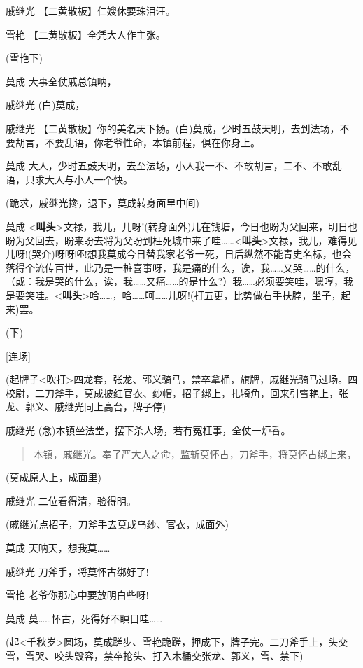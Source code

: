 戚继光 【二黄散板】仁嫂休要珠泪汪。

雪艳 【二黄散板】全凭大人作主张。

(雪艳下)

莫成 大事全仗戚总镇呐，

戚继光 (白)莫成，

戚继光
【二黄散板】你的美名天下扬。(白)莫成，少时五鼓天明，去到法场，不要胡言，不要乱语，你老爷性命，本镇前程，俱在你身上。

莫成
大人，少时五鼓天明，去至法场，小人我一不、不敢胡言，二不、不敢乱语，只求大人与小人一个快。

(跪求，戚继光搀，退下，莫成转身面里中间)

莫成
\textless{}\textbf{叫头}\textgreater{}文禄，我儿，儿呀!(转身面外)儿在钱塘，今日也盼为父回来，明日也盼为父回去，盼来盼去将为父盼到枉死城中来了哇\ldots{}\ldots{}\textless{}\textbf{叫头}\textgreater{}文禄，我儿，难得见儿呀!(哭介)呀呀呸!想我莫成今日替我家老爷一死，日后纵然不能青史名标，也会落得个流传百世，此乃是一桩喜事呀，我是痛的什么，诶，我\ldots{}\ldots{}又哭\ldots{}\ldots{}的什么，（或：我是哭的什么，诶，我\ldots{}\ldots{}又痛\ldots{}\ldots{}的是什么?）我\ldots{}\ldots{}必须要笑哇，嗯哼，我是要笑哇。\textless{}\textbf{叫头}\textgreater{}哈\ldots{}\ldots{}，哈\ldots{}\ldots{}呵\ldots{}\ldots{}儿呀!(打五更，比势做右手扶脖，坐子，起来)罢。

(下)

{[}连场{]}

(起牌子\textless{}吹打\textgreater{}四龙套，张龙、郭义骑马，禁卒拿桶，旗牌，戚继光骑马过场。四校尉，二刀斧手，莫成披红官衣、纱帽，招子绑上，扎犄角，回来引雪艳上，张龙、郭义、戚继光同上高台，牌子停)

戚继光 (念)本镇坐法堂，摆下杀人场，若有冤枉事，全仗一炉香。

\begin{quote}
本镇，戚继光。奉了严大人之命，监斩莫怀古，刀斧手，将莫怀古绑上来，
\end{quote}

(莫成原人上，成面里)

戚继光 二位看得清，验得明。

(戚继光点招子，刀斧手去莫成乌纱、官衣，成面外)

莫成 天呐天，想我莫\ldots{}\ldots{}

戚继光 刀斧手，将莫怀古绑好了!

雪艳 老爷你那心中要放明白些呀!

莫成 莫\ldots{}\ldots{}怀古，死得好不瞑目哇\ldots{}\ldots{}

(起\textless{}千秋岁\textgreater{}圆场，莫成蹉步、雪艳跪蹉，押成下，牌子完。二刀斧手上，头交雪，雪哭、咬头毁容，禁卒抢头、打入木桶交张龙、郭义，雪、禁下)

